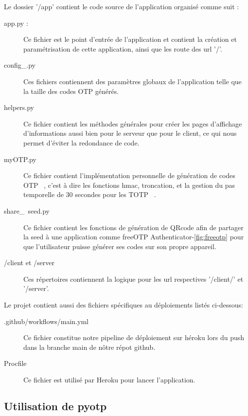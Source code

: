 \documentclass[a4paper, 10pt]{article}
\newcommand{\otp}{\textsc{OTP} }
\newcommand{\totp}{\textsc{TOTP} }
\begin{document}
\noindent
Le dossier '/app' contient le code source de l'application organisé comme suit :
\begin{description}
    \item[app.py :]
    Ce fichier est le point d'entrée de l'application et contient la \textcolor{myblue}{création et paramétrisation} de cette application, ainsi que les route des url '/'.
    \item[config\_\*.py]
    Ces fichiers contiennent des \textcolor{myblue}{paramètres globaux} de l'application telle que la taille des codes \otp générés.
    \item[helpers.py]
    Ce fichier contient les méthodes générales pour créer les pages d'\textcolor{myblue}{affichage d'informations} aussi bien pour le serveur que pour le client, ce qui nous permet d'éviter la redondance de code.
    \item[myOTP.py]
    Ce fichier contient l'\textcolor{myblue}{implémentation personnelle} de génération de codes \otp\ , c'est à dire les fonctions \textcolor{mygreen}{hmac}, \textcolor{mygreen}{troncation}, et la \textcolor{mygreen}{gestion du pas temporelle} de 30 secondes pour les \totp\ .
    \item[share\_\ seed.py]
    Ce fichier contient les fonctions de \textcolor{myblue}{génération de QRcode} afin de partager la seed à une application comme \textcolor{mygreen}{freeOTP Authenticator-\ref{fig:freeotp}} pour que l'utilisateur puisse générer ses codes sur son propre appareil.
    \item[/client et /server] 
    Ces répertoires contiennent la logique pour les url respectives '/client/' et '/server'.\\
\end{description}

\noindent
Le projet contient aussi des fichiers spécifiques au déploiements listés ci-dessous:
\begin{description}
    \item[.github/workflows/main.yml] 
    Ce fichier constitue notre \textcolor{myblue}{pipeline de déploiement} sur \textcolor{mygreen}{héroku} lors du push dans la branche main de nôtre répot github.
    \item[Procfile] 
    Ce fichier est utilisé par Heroku pour \textcolor{myblue}{lancer l'application}.\\
\end{description}


    \subsection{Utilisation de pyotp}
\end{document}
